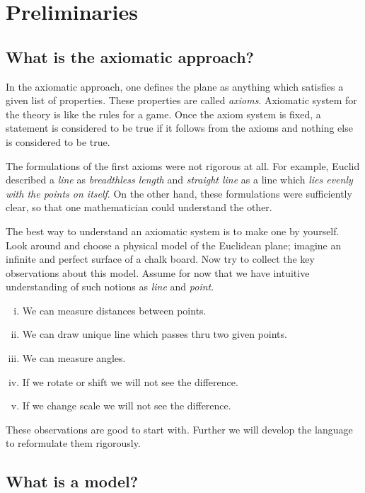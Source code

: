 \chapter{Preliminaries}\label{chap:metr}

\section*{What is the axiomatic approach?}

In the axiomatic approach,
one defines the plane as anything which satisfies 
a given list of properties.
These properties are called {}\emph{axioms}.
Axiomatic system for the theory 
is like the rules for a game.
Once the axiom system is fixed, a statement is considered to be true if it follows from the axioms and nothing else is considered to be true.

The formulations of the first axioms were not rigorous at all.
For example, Euclid described a {}\emph{line} as {}\emph{breadthless length}
and {}\emph{straight line} as a line which {}\emph{lies evenly with the points on itself}.
On the other hand,
these formulations were sufficiently clear, 
so that one mathematician could understand the other.

The best way to understand an axiomatic system
is to make one by yourself.
Look around and choose a physical model 
of the Euclidean plane;
imagine an infinite and perfect surface of a chalk board. 
Now try to collect the key observations
about this model.
Assume for now that we have intuitive understanding of such notions as {}\emph{line} and {}\emph{point}.
\begin{enumerate}[(i)]
 \item\label{preaxiomI} We can measure distances between points.
 \item\label{preaxiomII} We can draw unique line 
 which passes thru two given points.
 \item\label{preaxiomIII} We can measure angles.
 \item\label{preaxiomIV} If we rotate or shift we will not see the difference.
 \item\label{preaxiomV} If we change scale we will not see the difference.
\end{enumerate}
These observations are good to start with.
Further we will develop the language
to reformulate them rigorously.

\section*{What is a model?}

